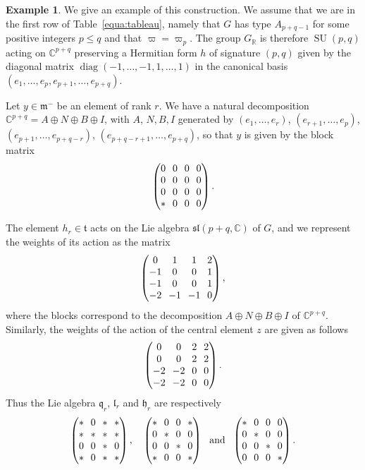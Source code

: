 \documentclass[JEP,XML,SOM,Unicode,NoFloatCountersInSection]{cedram}
\theoremstyle{plain}
\theoremstyle{definition}
\newtheorem{exem}[theo]{Example}
\let\rgy r
\DeclareMathOperator{\diag}{diag}
\DeclareMathOperator{\SU}{SU}
\newcommand{\bC}{\mathbb{C}}
\newcommand{\bR}{\mathbb{R}}
\newcommand{\fh}{\mathfrak{h}}
\newcommand{\fl}{\mathfrak{l}}
\newcommand{\fm}{\mathfrak{m}}
\newcommand{\fq}{\mathfrak{q}}
\newcommand{\ft}{\mathfrak{t}}
\newcommand{\fsl}{\mathfrak{sl}}
\begin{document}
\begin{exem}\label{exem:typeA}
We give an example of this construction.
We assume that we are in the first row of Table~\ref{equa:tableau}, namely that $G$ has
type $A_{p+q-1}$ for some positive integers $p\leq q$ and that $\varpi = \varpi_p$. The group $G_\bR$
is therefore $\SU(p,q)$ acting on $\bC^{p+q}$ preserving a Hermitian form $h$ of signature $(p,q)$ given
by the diagonal matrix $\diag(-1,\ldots,-1,1,\ldots,1)$ in the canonical basis
$(e_1,\ldots,e_p,e_{p+1},\ldots,e_{p+q})$.

Let
$y\in\fm^-$ be an element of rank $\rgy$. We have a natural decomposition $\bC^{p+q}=A \oplus N
\oplus B \oplus I$, with $A$, \resp $N,B,I$ generated by $(e_1,\ldots,e_\rgy)$, \resp $(e_{\rgy+1},\ldots,e_p)$, $(e_{p+1},\ldots,e_{p+q-\rgy})$, $(e_{p+q-\rgy+1},\ldots,e_{p+q})$, so
that $y$ is given by the block matrix
$$\arraycolsep3.5pt
\begin{pmatrix}
0 & 0 & 0 & 0 \\
0 & 0 & 0 & 0 \\
0 & 0 & 0 & 0 \\
* & 0 & 0 & 0
\end{pmatrix}.
$$

The element $h_\rgy \in \ft$ acts on the Lie algebra $\fsl(p+q,\bC)$ of $G$, and we represent the weights
of its action as the matrix
$$\arraycolsep3.5pt
\begin{pmatrix}
0 & 1 & 1 & 2 \\
-1 & 0 & 0 & 1 \\
-1 & 0 & 0 & 1 \\
-2 & -1 & -1 & 0
\end{pmatrix},
$$
where the blocks correspond to the decomposition $A \oplus N \oplus B \oplus I$
of $\bC^{p+q}$.
Similarly, the weights of the action of the central element $z$ are given as follows
$$\arraycolsep3.5pt
\begin{pmatrix}
0 & 0 & 2 & 2 \\
0 & 0 & 2 & 2 \\
-2 & -2 & 0 & 0 \\
-2 & -2 & 0 & 0
\end{pmatrix}.
$$
Thus the Lie algebra $\fq_\rgy$, $\fl_\rgy$ and $\fh_\rgy$ are respectively
$$\arraycolsep3.5pt
\begin{pmatrix}
* & 0 & * & * \\
* & * & * & * \\
0 & 0 & * & 0 \\
* & 0 & * & *
\end{pmatrix},\quad
\begin{pmatrix}
* & 0 & 0 & * \\
0 & * & 0 & 0\\
0 & 0 & * & 0 \\
* & 0 & 0 & *
\end{pmatrix}\ \mbox{ and } \
\begin{pmatrix}
* & 0 & 0 & 0 \\
0 & * & 0 & 0\\
0 & 0 & * & 0 \\
0 & 0 & 0 & *
\end{pmatrix}.
$$


\end{exem}
\end{document}
